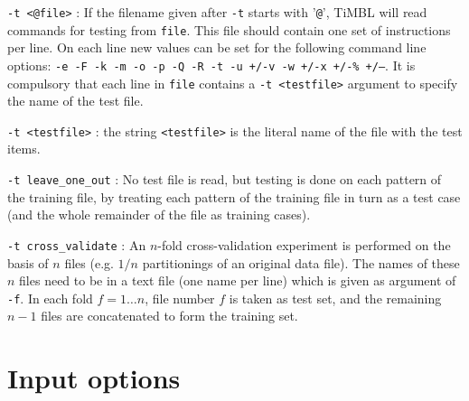 \documentclass{report}
\begin{document}
\begin{description}
\item {\tt -t <@file>} : If the filename given after {\tt -t} starts
with '{\tt @}', TiMBL will read commands for testing from {\tt file}.
This file should contain one set of instructions per line. On each
line new values can be set for the following command line options:
{\tt -e -F -k -m -o -p -Q -R -t -u +/-v -w +/-x +/-\% +/--}. It is compulsory
that each line in {\tt file} contains a {\tt -t <testfile>} argument
to specify the name of the test file.

\item {\tt -t <testfile>} : the string {\tt <testfile>} is the literal name
of the file with the test items.

\item {\tt -t leave\_one\_out} : No test file is read, but testing is
done on each pattern of the training file, by treating each pattern of
the training file in turn as a test case (and the whole remainder of
the file as training cases).

\item {\tt -t cross\_validate} : An $n$-fold cross-validation
experiment is performed on the basis of $n$ files (e.g. $1/n$
partitionings of an original data file). The names of these $n$ files
need to be in a text file (one name per line) which is given as
argument of {\tt -f}. In each fold $f=1 \ldots n$, file number $f$ is
taken as test set, and the remaining $n-1$ files are concatenated to
form the training set.

\end{description}

\section{Input options}
\end{document}
